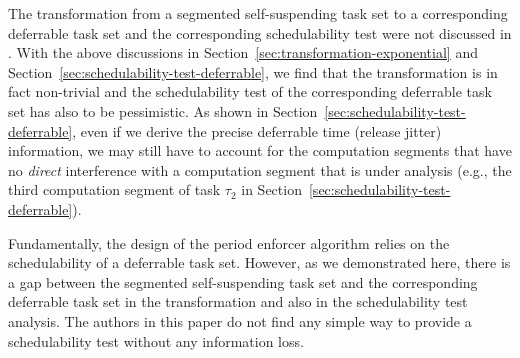 The transformation from a segmented self-suspending task set to a corresponding deferrable task set and the corresponding schedulability test were not discussed in \cite{Raj:suspension1991}. With the above discussions in Section~\ref{sec:transformation-exponential} and Section~\ref{sec:schedulability-test-deferrable}, we find that the transformation is in fact non-trivial and the schedulability test of the corresponding deferrable task set has also to be pessimistic. As shown in Section~\ref{sec:schedulability-test-deferrable}, even if we derive the precise deferrable time (release jitter) information, we may still have to account for the computation segments that have no \emph{direct} interference with a computation segment that is under analysis (e.g., the third computation segment of task $\tau_2$ in Section~\ref{sec:schedulability-test-deferrable}).

Fundamentally, the design of the period enforcer algorithm relies on the schedulability of a deferrable task set. However, as we demonstrated here, there is a gap between the segmented self-suspending task set and the corresponding deferrable task set in the transformation and also in the schedulability test analysis. The authors in this paper do not find any simple way to provide a schedulability test without any information loss.


